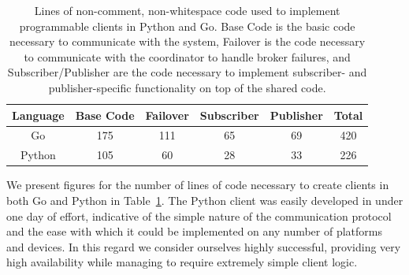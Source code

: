 \begin{table}
\centering
\caption{Lines of non-comment, non-whitespace code used to implement programmable clients in Python and Go.
Base Code is the basic code necessary to communicate with the system, Failover is the code necessary to communicate with the coordinator to handle broker failures, and Subscriber/Publisher are the code necessary to implement subscriber- and publisher-specific functionality on top of the shared code.}
\label{tbl:client_code}
\begin{tabular}{ | c | c | c | c | c | c | }
\hline
Language & Base Code & Failover & Subscriber & Publisher & Total
\\\hline
Go & 175 & 111 & 65 & 69 & 420
\\\hline
Python & 105 & 60 & 28 & 33 & 226
\\\hline
\end{tabular}
\end{table}

We present figures for the number of lines of code necessary to create clients in both Go and Python in Table~\ref{tbl:client_code}.
The Python client was easily developed in under one day of effort, indicative of the simple nature of the communication protocol and the ease with which it could be implemented on any number of platforms and devices.
In this regard we consider ourselves highly successful, providing very high availability while managing to require extremely simple client logic.

